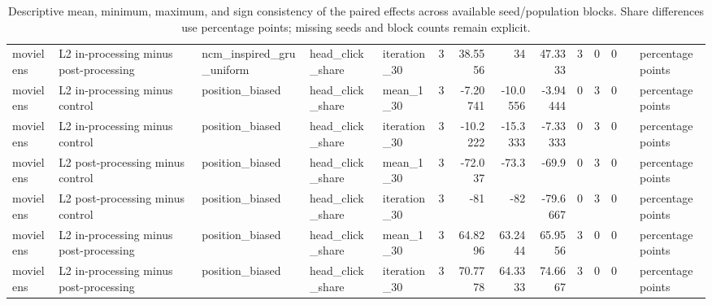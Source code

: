 \begin{table}[htbp!]
\begin{tabular}{lllllrrrrrrrll}
movielens & L2 in-processing minus post-processing & ncm\_inspired\_gru\_uniform & head\_click\_share & iteration\_30 & 3 & 38.5556 & 34 & 47.3333 & 3 & 0 & 0 &  & percentage points \\
movielens & L2 in-processing minus control & position\_biased & head\_click\_share & mean\_1\_30 & 3 & -7.20741 & -10.0556 & -3.94444 & 0 & 3 & 0 &  & percentage points \\
movielens & L2 in-processing minus control & position\_biased & head\_click\_share & iteration\_30 & 3 & -10.2222 & -15.3333 & -7.33333 & 0 & 3 & 0 &  & percentage points \\
movielens & L2 post-processing minus control & position\_biased & head\_click\_share & mean\_1\_30 & 3 & -72.037 & -73.3 & -69.9 & 0 & 3 & 0 &  & percentage points \\
movielens & L2 post-processing minus control & position\_biased & head\_click\_share & iteration\_30 & 3 & -81 & -82 & -79.6667 & 0 & 3 & 0 &  & percentage points \\
movielens & L2 in-processing minus post-processing & position\_biased & head\_click\_share & mean\_1\_30 & 3 & 64.8296 & 63.2444 & 65.9556 & 3 & 0 & 0 &  & percentage points \\
movielens & L2 in-processing minus post-processing & position\_biased & head\_click\_share & iteration\_30 & 3 & 70.7778 & 64.3333 & 74.6667 & 3 & 0 & 0 &  & percentage points \\
\hline
\end{tabular}
\caption{Descriptive mean, minimum, maximum, and sign consistency of the paired effects across available seed/population blocks. Share differences use percentage points; missing seeds and block counts remain explicit.}
\label{chap:results:tab:rq4_seed_consistency_head_click_share}
\end{table}
